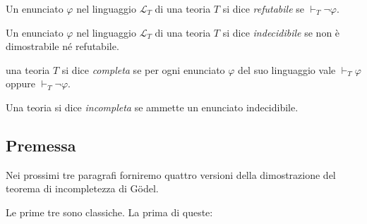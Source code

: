 	\begin{defi}
		Un enunciato $\varphi$ nel linguaggio $\mathcal{L}_T$ di una teoria $T$
		si dice \emph{refutabile} se $\vdash_T\neg\varphi$.
	\end{defi}
	
	\begin{defi}
		Un enunciato $\varphi$ nel linguaggio $\mathcal{L}_T$ di una teoria $T$
		si dice \emph{indecidibile} se non \`e dimostrabile n\'e refutabile.
	\end{defi}
	
	\begin{defi}
		una teoria $T$ si dice \emph{\textit{completa}} se per ogni enunciato 
		$\varphi$ del suo linguaggio vale $\vdash_{T}\varphi$ oppure
		$\vdash_{T}\neg\varphi$.
	\end{defi} 
	
	\begin{defi}
		Una teoria si dice \textit{\emph{incompleta}} se ammette un enunciato
		indecidibile.
	\end{defi}

\subsection{Premessa}
	Nei prossimi tre paragrafi forniremo quattro versioni della dimostrazione
	del teorema di incompletezza di G\"odel.
	
	Le prime tre sono classiche. La prima di queste:
	
